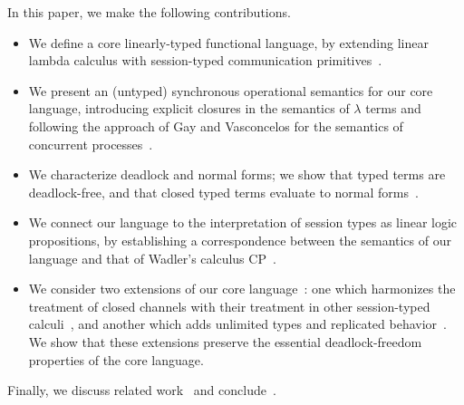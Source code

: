 \documentclass[oribibl,orivec,envcountsame]{llncs}
\begin{document}
In this paper, we make the following contributions.
\begin{itemize}
\item We define a core linearly-typed functional language, by extending linear lambda calculus
  with session-typed communication primitives~.
\item We present an (untyped) synchronous operational semantics for our core language, introducing
  explicit closures in the semantics of $\lambda$ terms and following the approach of Gay and
  Vasconcelos for the semantics of concurrent processes~.
\item We characterize deadlock and normal forms; we show that typed terms are deadlock-free, and
  that closed typed terms evaluate to normal forms~.
\item We connect our language to the interpretation of session types as linear logic propositions,
  by establishing a correspondence between the semantics of our language and that of Wadler's
  calculus CP~.
\item We consider two extensions of our core language~: one which harmonizes the
  treatment of closed channels with their treatment in other session-typed calculi~,
  and another which adds unlimited types and replicated behavior~.  We show that
  these extensions preserve the essential deadlock-freedom properties of the core language.
\end{itemize}
Finally, we discuss related work~ and conclude~.
\end{document}
